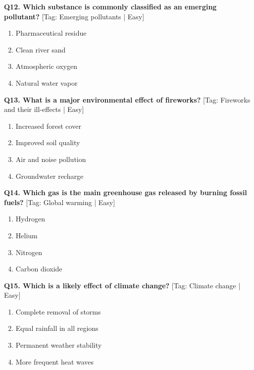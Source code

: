\noindent\textbf{Q12. Which substance is commonly classified as an emerging pollutant?} \hfill [Tag: Emerging pollutants | Easy]
\begin{enumerate}[label=(\alph*),topsep=2pt,itemsep=1pt,partopsep=0pt,parsep=0pt]
    \item {Pharmaceutical residue}
    \item {Clean river sand}
    \item {Atmospheric oxygen}
    \item {Natural water vapor}
\end{enumerate}
\vspace{2mm}

\noindent\textbf{Q13. What is a major environmental effect of fireworks?} \hfill [Tag: Fireworks and their ill-effects | Easy]
\begin{enumerate}[label=(\alph*),topsep=2pt,itemsep=1pt,partopsep=0pt,parsep=0pt]
    \item {Increased forest cover}
    \item {Improved soil quality}
    \item {Air and noise pollution}
    \item {Groundwater recharge}
\end{enumerate}
\vspace{2mm}

\noindent\textbf{Q14. Which gas is the main greenhouse gas released by burning fossil fuels?} \hfill [Tag: Global warming | Easy]
\begin{enumerate}[label=(\alph*),topsep=2pt,itemsep=1pt,partopsep=0pt,parsep=0pt]
    \item {Hydrogen}
    \item {Helium}
    \item {Nitrogen}
    \item {Carbon dioxide}
\end{enumerate}
\vspace{2mm}

\noindent\textbf{Q15. Which is a likely effect of climate change?} \hfill [Tag: Climate change | Easy]
\begin{enumerate}[label=(\alph*),topsep=2pt,itemsep=1pt,partopsep=0pt,parsep=0pt]
    \item {Complete removal of storms}
    \item {Equal rainfall in all regions}
    \item {Permanent weather stability}
    \item {More frequent heat waves}
\end{enumerate}
\vspace{2mm}

